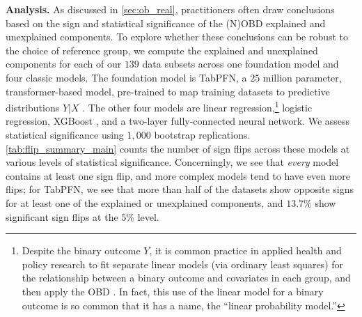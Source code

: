 \textbf{Analysis.}
As discussed in \cref{sec:ob_real}, practitioners often draw conclusions based on the sign and statistical significance of the (N)OBD explained and unexplained components.
To explore whether these conclusions can be robust to the choice of reference group, we compute the explained and unexplained components for each of our $139$ data subsets across one foundation model and four classic models. The foundation model is TabPFN, a $25$ million parameter, transformer-based model, pre-trained to map training datasets to predictive distributions $Y|X$ \citep{hollmann2023tabpfn}. The other four models are linear regression,\footnote{Despite the binary outcome $Y$, it is common practice in applied health and policy research to fit separate linear models (via ordinary least squares) for the relationship between a binary outcome and covariates in each group, and then apply the OBD \citep{jann2008, edokaChangesCatastrophicHealth2017, sujin_LPM_OB, mweembaGapSelfRatedHealth2023}. In fact, this use of the linear model for a binary outcome is so common that it has a name, the ``linear probability model.''} logistic regression, XGBoost \citep{chen2016xgboost}, and a two-layer fully-connected neural network.
We assess statistical significance using $1{,}000$ bootstrap replications.
\cref{tab:flip_summary_main} counts the number of sign flips across these models at various levels of statistical significance.
Concerningly, we see that \emph{every} model contains at least one sign flip, and more complex models tend to have even more flips; for TabPFN, we see that more than  half of the datasets show opposite signs for at least one of the explained or unexplained components, and $13.7\%$ show significant sign flips at the $5\%$ level.


